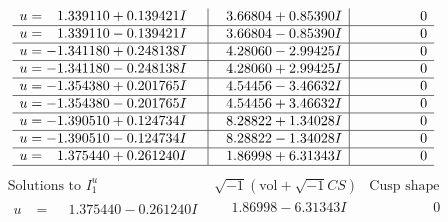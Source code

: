\documentclass[1p]{elsarticle_modified}
\theoremstyle{definition}
\newcommand{\I}{\sqrt{-1}}
\begin{document}
$$\begin{array}{c|c|c}
\begin{aligned}
u &= \phantom{-}1.339110 + 0.139421 I\end{aligned}
 & \phantom{-}3.66804 + 0.85390 I & \phantom{-0.000000 } 0 \\ \hline\begin{aligned}
u &= \phantom{-}1.339110 - 0.139421 I\end{aligned}
 & \phantom{-}3.66804 - 0.85390 I & \phantom{-0.000000 } 0 \\ \hline\begin{aligned}
u &= -1.341180 + 0.248138 I\end{aligned}
 & \phantom{-}4.28060 - 2.99425 I & \phantom{-0.000000 } 0 \\ \hline\begin{aligned}
u &= -1.341180 - 0.248138 I\end{aligned}
 & \phantom{-}4.28060 + 2.99425 I & \phantom{-0.000000 } 0 \\ \hline\begin{aligned}
u &= -1.354380 + 0.201765 I\end{aligned}
 & \phantom{-}4.54456 - 3.46632 I & \phantom{-0.000000 } 0 \\ \hline\begin{aligned}
u &= -1.354380 - 0.201765 I\end{aligned}
 & \phantom{-}4.54456 + 3.46632 I & \phantom{-0.000000 } 0 \\ \hline\begin{aligned}
u &= -1.390510 + 0.124734 I\end{aligned}
 & \phantom{-}8.28822 + 1.34028 I & \phantom{-0.000000 } 0 \\ \hline\begin{aligned}
u &= -1.390510 - 0.124734 I\end{aligned}
 & \phantom{-}8.28822 - 1.34028 I & \phantom{-0.000000 } 0 \\ \hline\begin{aligned}
u &= \phantom{-}1.375440 + 0.261240 I\end{aligned}
 & \phantom{-}1.86998 + 6.31343 I & \phantom{-0.000000 } 0\\
 \hline 
 \end{array}$$\newpage$$\begin{array}{c|c|c}  
\text{Solutions to }I^u_{1}& \I (\text{vol} + \sqrt{-1}CS) & \text{Cusp shape}\\
 \hline 
\begin{aligned}
u &= \phantom{-}1.375440 - 0.261240 I\end{aligned}
 & \phantom{-}1.86998 - 6.31343 I & \phantom{-0.000000 } 0 \\ \hline\begin{aligned}

\end{aligned}
\end{array}$$
\end{document}
